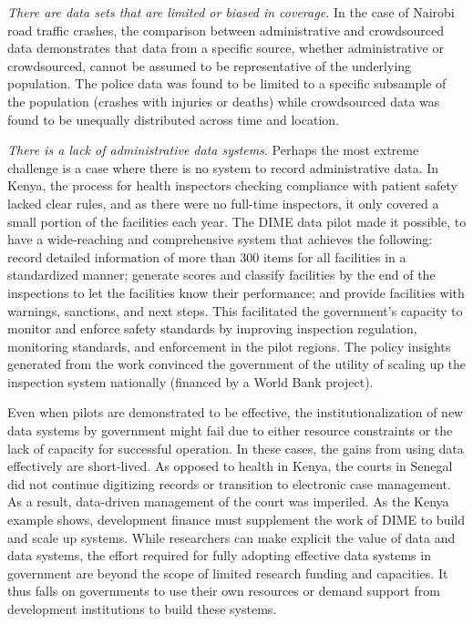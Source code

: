 \emph{There are data sets that are limited or biased in coverage.} In the case of Nairobi road traffic crashes, the comparison between administrative and crowdsourced data demonstrates that data from a specific source, whether administrative or crowdsourced, cannot be assumed to be representative of the underlying population. The police data was found to be limited to a specific subsample of the population (crashes with injuries or deaths) while crowdsourced data was found to be unequally distributed across time and location.

\emph{There is a lack of administrative data systems}. Perhaps the most extreme challenge is a case where there is no system to record administrative data. In Kenya, the process for health inspectors checking compliance with patient safety lacked clear rules, and as there were no full-time inspectors, it only covered a small portion of the facilities each year. The DIME data pilot made it possible, to have a wide-reaching and comprehensive system that achieves the following: record detailed information of more than 300 items for all facilities in a standardized manner; generate scores and classify facilities by the end of the inspections to let the facilities know their performance; and provide facilities with warnings, sanctions, and next steps. This facilitated the government's capacity to monitor and enforce safety standards by improving inspection regulation, monitoring standards, and enforcement in the pilot regions. The policy insights generated from the work convinced the government of the utility of scaling up the inspection system nationally (financed by a World Bank project).

Even when pilots are demonstrated to be effective, the institutionalization of new data systems by government might fail due to either resource constraints or the lack of capacity for successful operation. In these cases, the gains from using data effectively are short-lived. As opposed to health in Kenya, the courts in Senegal did not continue digitizing records or transition to electronic case management. As a result, data-driven management of the court was imperiled. As the Kenya example shows, development finance must supplement the work of DIME to build and scale up systems. While researchers can make explicit the value of data and data systems, the effort required for fully adopting effective data systems in government are beyond the scope of limited research funding and capacities. It thus falls on governments to use their own resources or demand support from development institutions to build these systems.

